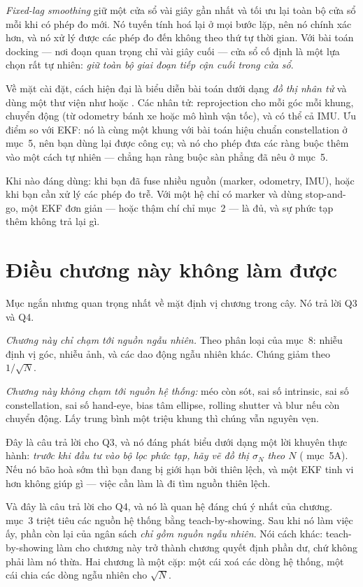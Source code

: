 \documentclass[../../marker.tex]{subfiles}
\begin{document}
\emph{Fixed-lag smoothing} giữ một cửa sổ vài giây gần nhất và tối ưu lại toàn bộ cửa sổ mỗi khi có phép đo mới. Nó tuyến tính hoá lại ở mọi bước lặp, nên nó chính xác hơn, và nó xử lý được các phép đo đến không theo thứ tự thời gian. Với bài toán docking --- nơi đoạn quan trọng chỉ vài giây cuối --- cửa sổ cố định là một lựa chọn rất tự nhiên: \emph{giữ toàn bộ giai đoạn tiếp cận cuối trong cửa sổ}.

Về mặt cài đặt, cách hiện đại là biểu diễn bài toán dưới dạng \emph{đồ thị nhân tử} \cite{dellaert2017factor} và dùng một thư viện như  hoặc . Các nhân tử: reprojection cho mỗi góc mỗi khung, chuyển động (từ odometry bánh xe hoặc mô hình vận tốc), và có thể cả IMU. Ưu điểm so với EKF: nó là cùng một khung với bài toán hiệu chuẩn constellation ở  mục~5, nên bạn dùng lại được công cụ; và nó cho phép đưa các ràng buộc thêm vào một cách tự nhiên --- chẳng hạn ràng buộc sàn phẳng đã nêu ở  mục~5.

Khi nào đáng dùng: khi bạn đã fuse nhiều nguồn (marker, odometry, IMU), hoặc khi bạn cần xử lý các phép đo trễ. Với một hệ chỉ có marker và dùng stop-and-go, một EKF đơn giản --- hoặc thậm chí chỉ mục~2 --- là đủ, và sự phức tạp thêm không trả lại gì.

\section{Điều chương này không làm được}

Mục ngắn nhưng quan trọng nhất về mặt định vị chương trong cây. Nó trả lời Q3 và Q4.

\emph{Chương này chỉ chạm tới nguồn ngẫu nhiên.} Theo phân loại của  mục~8: nhiễu định vị góc, nhiễu ảnh, và các dao động ngẫu nhiên khác. Chúng giảm theo \(1/\sqrt{N}\).

\emph{Chương này không chạm tới nguồn hệ thống:} méo còn sót, sai số intrinsic, sai số constellation, sai số hand-eye, bias tâm ellipse, rolling shutter và blur nếu còn chuyển động. Lấy trung bình một triệu khung thì chúng vẫn nguyên vẹn.

Đây là câu trả lời cho Q3, và nó đáng phát biểu dưới dạng một lời khuyên thực hành: \emph{trước khi đầu tư vào bộ lọc phức tạp, hãy vẽ đồ thị \(\sigma_N\) theo \(N\)} ( mục~5A). Nếu nó bão hoà sớm thì bạn đang bị giới hạn bởi thiên lệch, và một EKF tinh vi hơn không giúp gì --- việc cần làm là đi tìm nguồn thiên lệch.

Và đây là câu trả lời cho Q4, và nó là quan hệ đáng chú ý nhất của chương.  mục~3 triệt tiêu các nguồn hệ thống bằng teach-by-showing. Sau khi nó làm việc ấy, phần còn lại của ngân sách \emph{chỉ gồm nguồn ngẫu nhiên}. Nói cách khác: teach-by-showing làm cho chương này trở thành chương quyết định phần dư, chứ không phải làm nó thừa. Hai chương là một cặp: một cái xoá các dòng hệ thống, một cái chia các dòng ngẫu nhiên cho \(\sqrt{N}\).
\end{document}
